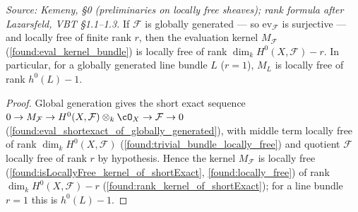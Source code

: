 \begin{lemma}
  \label{found:eval_kernel_locally_free}
  \textit{Source: Kemeny, \S0 (preliminaries on locally free sheaves); rank formula after Lazarsfeld, VBT \S1.1--1.3.}
  If \(\mathcal F\) is globally generated --- so \(\mathrm{ev}_{\mathcal F}\) is
  surjective --- and locally free of finite rank \(r\), then the evaluation kernel
  \(M_{\mathcal F}\) (\cref{found:eval_kernel_bundle}) is locally free of rank
  \(\dim_k H^0(X,\mathcal F)-r\).  In particular, for a globally generated line bundle
  \(L\) (\(r=1\)), \(M_L\) is locally free of rank \(h^0(L)-1\).
\end{lemma}

\begin{proof}
  Global generation gives the short exact sequence
  \(0\to M_{\mathcal F}\to H^0(X,\mathcal F)\otimes_k\cO_X\to\mathcal F\to 0\)
  (\cref{found:eval_shortexact_of_globally_generated}), with middle term locally free
  of rank \(\dim_k H^0(X,\mathcal F)\) (\cref{found:trivial_bundle_locally_free}) and
  quotient \(\mathcal F\) locally free of rank \(r\) by hypothesis.  Hence the kernel
  \(M_{\mathcal F}\) is locally free (\cref{found:isLocallyFree_kernel_of_shortExact},
  \cref{found:locally_free}) of rank
  \(\dim_k H^0(X,\mathcal F)-r\) (\cref{found:rank_kernel_of_shortExact}); for a line
  bundle \(r=1\) this is \(h^0(L)-1\).
\end{proof}
